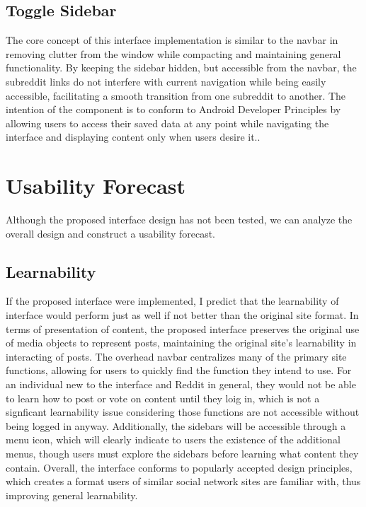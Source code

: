 \documentclass{article}
\begin{document}
\subsection{Toggle Sidebar} The core concept of this interface implementation is similar to the navbar in removing clutter from the window while compacting and maintaining general functionality. By keeping the sidebar hidden, but accessible from the navbar, the subreddit links do not interfere with current navigation while being easily accessible, facilitating a smooth transition from one subreddit to another. The intention of the component is to conform to Android Developer Principles by allowing users to access their saved data at any point while navigating the interface and displaying content only when users desire it.\cite{Android}.

\section{Usability Forecast} Although the proposed interface design has not been tested, we can analyze the overall design and construct a usability forecast.

\subsection{Learnability} If the proposed interface were implemented, I predict that the learnability of interface would perform just as well if not better than the original site format. In terms of presentation of content, the proposed interface preserves the original use of media objects to represent posts, maintaining the original site's learnability in interacting of posts. The overhead navbar centralizes many of the primary site functions, allowing for users to quickly find the function they intend to use. For an individual new to the interface and Reddit in general, they would not be able to learn how to post or vote on content until they loig in, which is not a signficant learnability issue considering those functions are not accessible without being logged in anyway. Additionally, the sidebars will be accessible through a menu icon, which will clearly indicate to users the existence of the additional menus, though users must explore the sidebars before learning what content they contain. Overall, the interface conforms to popularly accepted design principles, which creates a format users of similar social network sites are familiar with, thus improving general learnability.
\end{document}
